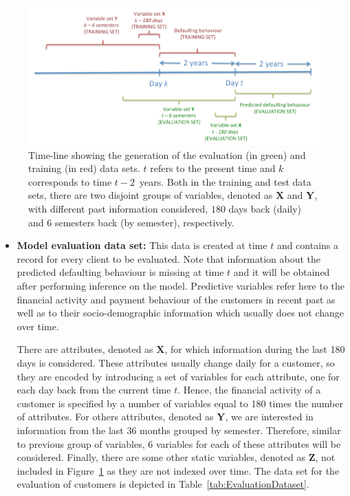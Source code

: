 \documentclass{article}
\theoremstyle{theorem}
\theoremstyle{definition}
\newcommand{\X}{\mathbf{X}}
\newcommand{\Y}{\mathbf{Y}}
\newcommand{\Z}{\mathbf{Z}}
\begin{document}
{\begin{figure}[ht!]
\centering
\includegraphics[scale=0.35]{figures/CajamarTimeLine}
\caption{\label{Figure:CajaMarTimeLine}Time-line showing the generation of the evaluation (in green) and training (in red) data sets. $t$ refers to the present time and $k$ corresponds to time $t-2$\ years. Both in the training and test data sets, there are two disjoint groups of variables, denoted as $\X$ and $\Y$, with different past information considered, $180$ days back (daily) and $6$ semesters back (by semester), respectively.}

\end{figure}

\begin{itemize}

\item \textbf{Model evaluation data set:} This data is created at time $t$ and contains a record for every client to be evaluated. Note that information about the predicted defaulting behaviour is missing at time $t$ and it will be obtained after performing inference on the model. Predictive variables refer here to the financial activity and payment behaviour of the customers in recent past as well as to their socio-demographic information which usually does not change over time. 

There are attributes, denoted as $\X$, for which information during the last 180 days is considered. 
These attributes usually change daily for a customer, so they are encoded by introducing a set of variables for each attribute, one for each day back from the current time $t$. Hence, the financial activity of a customer is specified by a number of variables equal to 180 times the number of attributes. For others attributes, denoted as $\Y$, we are interested in information from the last $36$ months grouped by semester. 
Therefore, similar to previous group of variables, $6$ variables for each of these attributes will be considered. Finally, there are some other static variables, denoted as $\Z$, not included in Figure~\ref{Figure:CajaMarTimeLine} as they are not indexed over time. The data set for the evaluation of customers is depicted in Table~\ref{tab:EvaluationDataset}. 



\end{itemize}}
\end{document}
